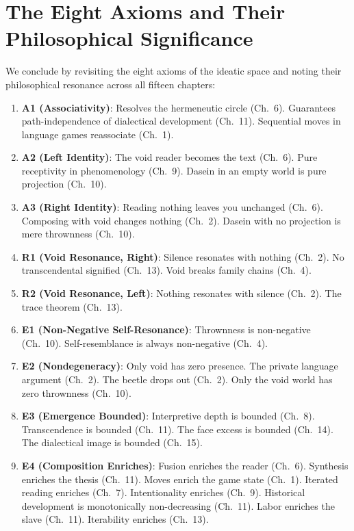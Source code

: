 \section{The Eight Axioms and Their Philosophical Significance}

We conclude by revisiting the eight axioms of the ideatic space and noting
their philosophical resonance across all fifteen chapters:

\begin{enumerate}
\item \textbf{A1 (Associativity)}: Resolves the hermeneutic circle (Ch.~6).
Guarantees path-independence of dialectical development (Ch.~11).
Sequential moves in language games reassociate (Ch.~1).

\item \textbf{A2 (Left Identity)}: The void reader becomes the text (Ch.~6).
Pure receptivity in phenomenology (Ch.~9). Dasein in an empty world is
pure projection (Ch.~10).

\item \textbf{A3 (Right Identity)}: Reading nothing leaves you unchanged (Ch.~6).
Composing with void changes nothing (Ch.~2). Dasein with no projection
is mere thrownness (Ch.~10).

\item \textbf{R1 (Void Resonance, Right)}: Silence resonates with nothing
(Ch.~2). No transcendental signified (Ch.~13). Void breaks family chains (Ch.~4).

\item \textbf{R2 (Void Resonance, Left)}: Nothing resonates with silence
(Ch.~2). The trace theorem (Ch.~13).

\item \textbf{E1 (Non-Negative Self-Resonance)}: Thrownness is non-negative
(Ch.~10). Self-resemblance is always non-negative (Ch.~4).

\item \textbf{E2 (Nondegeneracy)}: Only void has zero presence. The private
language argument (Ch.~2). The beetle drops out (Ch.~2). Only the void world
has zero thrownness (Ch.~10).

\item \textbf{E3 (Emergence Bounded)}: Interpretive depth is bounded (Ch.~8).
Transcendence is bounded (Ch.~11). The face excess is bounded (Ch.~14).
The dialectical image is bounded (Ch.~15).

\item \textbf{E4 (Composition Enriches)}: Fusion enriches the reader (Ch.~6).
Synthesis enriches the thesis (Ch.~11). Moves enrich the game state (Ch.~1).
Iterated reading enriches (Ch.~7). Intentionality enriches (Ch.~9).
Historical development is monotonically non-decreasing (Ch.~11).
Labor enriches the slave (Ch.~11). Iterability enriches (Ch.~13).
\end{enumerate}

